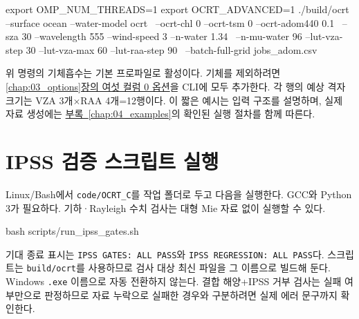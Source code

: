 \par\noindent\begin{minipage}{\linewidth}
\begin{ManualCode}
export OMP_NUM_THREADS=1
export OCRT_ADVANCED=1
./build/ocrt --surface ocean --water-model ocrt \
  --ocrt-chl 0 --ocrt-tsm 0 --ocrt-adom440 0.1 \
  --sza 30 --wavelength 555 --wind-speed 3 --n-water 1.34 \
  --n-mu-water 96 --lut-vza-step 30 --lut-vza-max 60 --lut-raa-step 90 \
  --batch-full-grid jobs_adom.csv
\end{ManualCode}
\end{minipage}\par

위 명령의 기체흡수는 기본 프로파일로 활성이다. 기체를 제외하려면 \hyperref[chap:03_options]{\ref*{chap:03_options}장의 여섯 컬럼 0 옵션}을 CLI에 모두 추가한다. 각 행의 예상 격자 크기는 VZA 3개\ensuremath{\times}RAA 4개=12행이다. 이 짧은 예시는 입력 구조를 설명하며, 실제 자료 생성에는 \hyperref[chap:04_examples]{부록~\ref*{chap:04_examples}}의 확인된 실행 절차를 함께 따른다.

\section{IPSS 검증 스크립트 실행}
\label{sec:auto:04_examples:17}
\label{sec:example_ipss_gates}

Linux/Bash에서 \texttt{code/\allowbreak{}OCRT\_\allowbreak{}C}를 작업 폴더로 두고 다음을 실행한다. GCC와 Python 3가 필요하다. 기하·Rayleigh 수치 검사는 대형 Mie 자료 없이 실행할 수 있다.


\par\noindent\begin{minipage}{\linewidth}
\begin{ManualCode}
bash scripts/run_ipss_gates.sh
\end{ManualCode}
\end{minipage}\par

기대 종료 표시는 \texttt{IPSS GATES:\allowbreak{} ALL PASS}와 \texttt{IPSS REGRESSION:\allowbreak{} ALL PASS}다. 스크립트는 \texttt{build/\allowbreak{}ocrt}를 사용하므로 검사 대상 최신 파일을 그 이름으로 빌드해 둔다. Windows \texttt{.\allowbreak{}exe} 이름으로 자동 전환하지 않는다. 결합 해양+IPSS 거부 검사는 실패 여부만으로 판정하므로 자료 누락으로 실패한 경우와 구분하려면 실제 에러 문구까지 확인한다.
